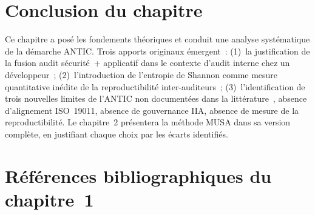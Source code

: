 \documentclass[12pt,a4paper,oneside]{report}
\begin{document}
\section*{Conclusion du chapitre}

Ce chapitre a pos\'e les fondements th\'eoriques et conduit une analyse syst\'ematique
de la d\'emarche ANTIC. Trois apports originaux \'emergent~: (1)~la justification de
la fusion audit s\'ecurit\'e~+ applicatif dans le contexte d'audit interne chez un
d\'eveloppeur~; (2)~l'introduction de l'entropie de Shannon comme mesure quantitative
in\'edite de la reproductibilit\'e inter-auditeurs~; (3)~l'identification de trois
nouvelles limites de l'ANTIC non document\'ees dans la litt\'erature~, absence
d'alignement ISO~19011, absence de gouvernance IIA, absence de mesure de la
reproductibilit\'e. Le chapitre~2 pr\'esentera la m\'ethode MUSA dans sa version
compl\`ete, en justifiant chaque choix par les \'ecarts identifi\'es.

\section*{R\'ef\'erences bibliographiques du chapitre~1}
\end{document}
